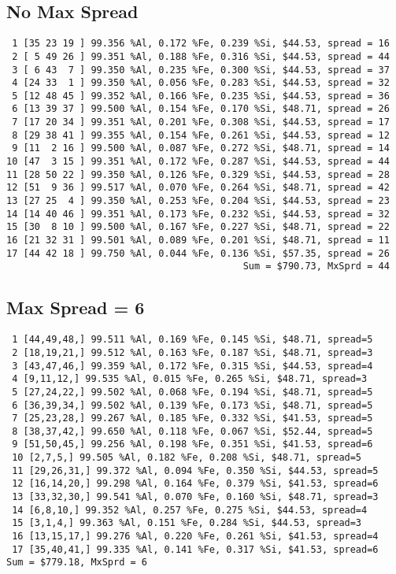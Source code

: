 \documentclass{article}
\begin{document}
\subsection{No Max Spread}
\begin{verbatim}
 1 [35 23 19 ] 99.356 %Al, 0.172 %Fe, 0.239 %Si, $44.53, spread = 16
 2 [ 5 49 26 ] 99.351 %Al, 0.188 %Fe, 0.316 %Si, $44.53, spread = 44
 3 [ 6 43  7 ] 99.350 %Al, 0.235 %Fe, 0.300 %Si, $44.53, spread = 37
 4 [24 33  1 ] 99.350 %Al, 0.056 %Fe, 0.283 %Si, $44.53, spread = 32
 5 [12 48 45 ] 99.352 %Al, 0.166 %Fe, 0.235 %Si, $44.53, spread = 36
 6 [13 39 37 ] 99.500 %Al, 0.154 %Fe, 0.170 %Si, $48.71, spread = 26
 7 [17 20 34 ] 99.351 %Al, 0.201 %Fe, 0.308 %Si, $44.53, spread = 17
 8 [29 38 41 ] 99.355 %Al, 0.154 %Fe, 0.261 %Si, $44.53, spread = 12
 9 [11  2 16 ] 99.500 %Al, 0.087 %Fe, 0.272 %Si, $48.71, spread = 14
10 [47  3 15 ] 99.351 %Al, 0.172 %Fe, 0.287 %Si, $44.53, spread = 44
11 [28 50 22 ] 99.350 %Al, 0.126 %Fe, 0.329 %Si, $44.53, spread = 28
12 [51  9 36 ] 99.517 %Al, 0.070 %Fe, 0.264 %Si, $48.71, spread = 42
13 [27 25  4 ] 99.350 %Al, 0.253 %Fe, 0.204 %Si, $44.53, spread = 23
14 [14 40 46 ] 99.351 %Al, 0.173 %Fe, 0.232 %Si, $44.53, spread = 32
15 [30  8 10 ] 99.500 %Al, 0.167 %Fe, 0.227 %Si, $48.71, spread = 22
16 [21 32 31 ] 99.501 %Al, 0.089 %Fe, 0.201 %Si, $48.71, spread = 11
17 [44 42 18 ] 99.750 %Al, 0.044 %Fe, 0.136 %Si, $57.35, spread = 26
                                          Sum = $790.73, MxSprd = 44
\end{verbatim}

\subsection{Max Spread = 6}
\begin{verbatim}
 1 [44,49,48,] 99.511 %Al, 0.169 %Fe, 0.145 %Si, $48.71, spread=5
 2 [18,19,21,] 99.512 %Al, 0.163 %Fe, 0.187 %Si, $48.71, spread=3
 3 [43,47,46,] 99.359 %Al, 0.172 %Fe, 0.315 %Si, $44.53, spread=4
 4 [9,11,12,] 99.535 %Al, 0.015 %Fe, 0.265 %Si, $48.71, spread=3
 5 [27,24,22,] 99.502 %Al, 0.068 %Fe, 0.194 %Si, $48.71, spread=5
 6 [36,39,34,] 99.502 %Al, 0.139 %Fe, 0.173 %Si, $48.71, spread=5
 7 [25,23,28,] 99.267 %Al, 0.185 %Fe, 0.332 %Si, $41.53, spread=5
 8 [38,37,42,] 99.650 %Al, 0.118 %Fe, 0.067 %Si, $52.44, spread=5
 9 [51,50,45,] 99.256 %Al, 0.198 %Fe, 0.351 %Si, $41.53, spread=6
 10 [2,7,5,] 99.505 %Al, 0.182 %Fe, 0.208 %Si, $48.71, spread=5
 11 [29,26,31,] 99.372 %Al, 0.094 %Fe, 0.350 %Si, $44.53, spread=5
 12 [16,14,20,] 99.298 %Al, 0.164 %Fe, 0.379 %Si, $41.53, spread=6
 13 [33,32,30,] 99.541 %Al, 0.070 %Fe, 0.160 %Si, $48.71, spread=3
 14 [6,8,10,] 99.352 %Al, 0.257 %Fe, 0.275 %Si, $44.53, spread=4
 15 [3,1,4,] 99.363 %Al, 0.151 %Fe, 0.284 %Si, $44.53, spread=3
 16 [13,15,17,] 99.276 %Al, 0.220 %Fe, 0.261 %Si, $41.53, spread=4
 17 [35,40,41,] 99.335 %Al, 0.141 %Fe, 0.317 %Si, $41.53, spread=6
Sum = $779.18, MxSprd = 6 
\end{verbatim}
\end{document}
